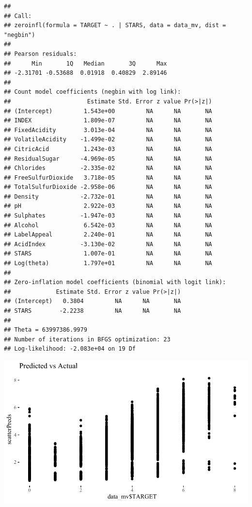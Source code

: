 \documentclass[]{elsarticle} %
\begin{document}
\begin{verbatim}
## 
## Call:
## zeroinfl(formula = TARGET ~ . | STARS, data = data_mv, dist = "negbin")
## 
## Pearson residuals:
##      Min       1Q   Median       3Q      Max 
## -2.31701 -0.53688  0.01918  0.40829  2.89146 
## 
## Count model coefficients (negbin with log link):
##                      Estimate Std. Error z value Pr(>|z|)
## (Intercept)         1.543e+00         NA      NA       NA
## INDEX               1.809e-07         NA      NA       NA
## FixedAcidity        3.013e-04         NA      NA       NA
## VolatileAcidity    -1.499e-02         NA      NA       NA
## CitricAcid          1.243e-03         NA      NA       NA
## ResidualSugar      -4.969e-05         NA      NA       NA
## Chlorides          -2.335e-02         NA      NA       NA
## FreeSulfurDioxide   3.718e-05         NA      NA       NA
## TotalSulfurDioxide -2.958e-06         NA      NA       NA
## Density            -2.732e-01         NA      NA       NA
## pH                  2.922e-03         NA      NA       NA
## Sulphates          -1.947e-03         NA      NA       NA
## Alcohol             6.542e-03         NA      NA       NA
## LabelAppeal         2.240e-01         NA      NA       NA
## AcidIndex          -3.130e-02         NA      NA       NA
## STARS               1.007e-01         NA      NA       NA
## Log(theta)          1.797e+01         NA      NA       NA
## 
## Zero-inflation model coefficients (binomial with logit link):
##             Estimate Std. Error z value Pr(>|z|)
## (Intercept)   0.3804         NA      NA       NA
## STARS        -2.2238         NA      NA       NA
## 
## Theta = 63997386.9979 
## Number of iterations in BFGS optimization: 23 
## Log-likelihood: -2.083e+04 on 19 Df
\end{verbatim}

\includegraphics{paper_files/figure-latex/unnamed-chunk-29-1.pdf}
\end{document}
